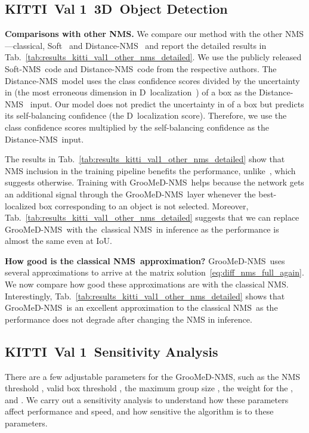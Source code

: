 \documentclass[final]{cvpr}
\newcommand{\myReferTable}[1]{Tab.~\ref{#1}}
\newcommand{\methodName}{GrooMeD-NMS}
\newcommand{\iou}{IoU}
\newcommand{\threeD}{D}
\newcommand{\iouThreeD}{\iou}
\newcommand{\classicalNmsShort}{classical}
\newcommand{\classicalNms}{classical NMS}
\newcommand{\softNmsCaps}{Soft-NMS}
\newcommand{\softNmsShortCaps}{Soft}
\newcommand{\distanceNmsCaps}{Distance-NMS}
\newcommand{\kitti}{KITTI}
\newcommand{\valOne}{Val 1}
\begin{document}
    

\subsection{\kitti~\valOne~3D~Object Detection}\label{sec:results_kitti_val1_additional}
    
    \textbf{Comparisons with other NMS.}
        We compare our method with the other NMS---\classicalNmsShort, \softNmsShortCaps~\cite{bodla2017soft} and \distanceNmsCaps~\cite{shi2020distance} and report the detailed results in \myReferTable{tab:results_kitti_val1_other_nms_detailed}. 
        We use the publicly released \softNmsCaps~code and \distanceNmsCaps~code from the respective authors.
        The \distanceNmsCaps~model uses the class confidence scores divided by the uncertainty in  (the most erroneous dimension in \threeD~localization~\cite{simonelli2020demystifying}) of a box as the \distanceNmsCaps~\cite{shi2020distance} input. 
        Our model does not predict the uncertainty in  of a box
        but predicts its self-balancing confidence (the \threeD~localization score). 
        Therefore, we use the class confidence scores multiplied by the self-balancing confidence as the \distanceNmsCaps~input.
        
        The results in \myReferTable{tab:results_kitti_val1_other_nms_detailed} show that NMS inclusion in the training pipeline benefits the performance, unlike~\cite{bodla2017soft}, which suggests otherwise.
        Training with \methodName~helps because the network gets an additional signal through the \methodName~layer whenever the best-localized box corresponding to an object is not selected. 
        Moreover, \myReferTable{tab:results_kitti_val1_other_nms_detailed} suggests that we can replace \methodName~with the~\classicalNms~in inference as the performance is almost the same even at \iouThreeD.

    \textbf{How good is the \classicalNms~approximation?}
        \methodName~uses several approximations to arrive at the matrix solution~\eqref{eq:diff_nms_full_again}.
        We now compare how good these approximations are with the \classicalNms. 
        Interestingly, \myReferTable{tab:results_kitti_val1_other_nms_detailed} shows that \methodName~is an excellent approximation to the \classicalNms~as the performance does not degrade after changing the NMS in inference.

    
\subsection{\kitti~\valOne~Sensitivity Analysis}
        There are a few adjustable parameters for the \methodName, such as the NMS threshold , valid box threshold , the maximum group size , the weight  for the , and . We carry out a sensitivity analysis to understand how these parameters affect performance and speed, and how sensitive the algorithm is to these parameters.
        
\end{document}
